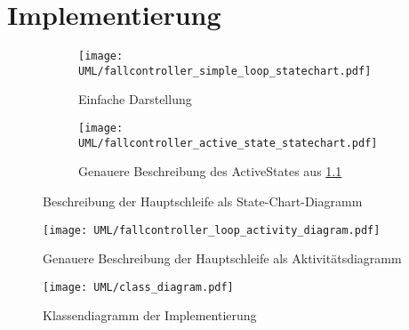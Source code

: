 \chapter{Implementierung}





\begin{figure}[hb] \centering
	\begin{subfigure}[b]{0.4\textwidth}
		\texttt{[image: UML/fallcontroller\_simple\_loop\_statechart.pdf]}
		\caption{Einfache Darstellung}
		\label{uml:statechart_simleloop}
	\end{subfigure}\hspace{1cm}
	\begin{subfigure}[b]{0.4\textwidth}
 		\texttt{[image: UML/fallcontroller\_active\_state\_statechart.pdf]}
		\caption{Genauere Beschreibung des ActiveStates aus \ref{uml:statechart_simleloop}}
		\label{uml:statechart_activeState}
	\end{subfigure}
	\caption{Beschreibung der Hauptschleife als State-Chart-Diagramm}
	\label{uml:statechart}
\end{figure}

\begin{figure}[hb] \centering
\end{figure}

\begin{figure}[hb] \centering
	\texttt{[image: UML/fallcontroller\_loop\_activity\_diagram.pdf]}
	\caption{Genauere Beschreibung der Hauptschleife als Aktivitätsdiagramm}
	\label{uml:activity_diagram}
\end{figure}

\begin{figure}[hb] \centering
	\texttt{[image: UML/class\_diagram.pdf]}
	\caption{Klassendiagramm der Implementierung}
	\label{uml:class_diagram}
\end{figure}
